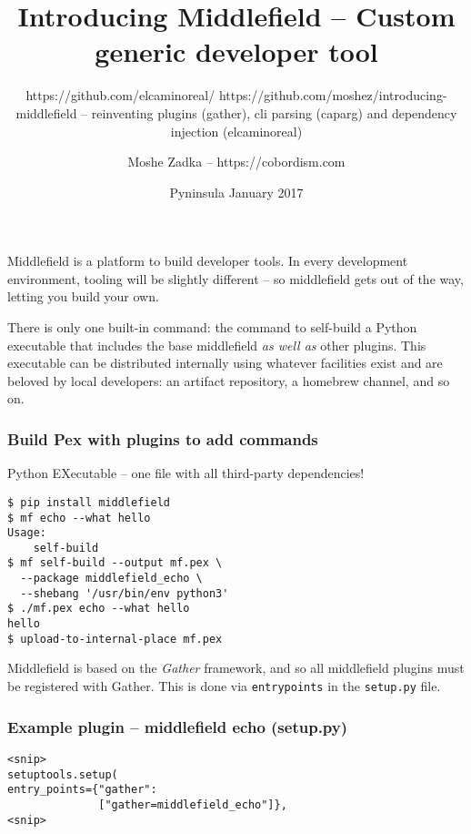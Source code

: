 \usepackage[utf8]{inputenc}
\usepackage{listings}
\usepackage{textcomp}

\title{Introducing Middlefield -- Custom generic developer tool}
\subtitle{https://github.com/elcaminoreal/ https://github.com/moshez/introducing-middlefield -- reinventing plugins (gather), cli parsing (caparg) and dependency injection (elcaminoreal)}
\author{Moshe Zadka -- https://cobordism.com}
\date{Pyninsula January 2017}
 

 
\begin{titlepage}
\maketitle
\end{titlepage}

\frame{\titlepage}

Middlefield is a platform to build developer tools.
In every development environment,
tooling will be slightly different --
so middlefield gets out of the way,
letting you build your own.

There is only one built-in command:
the command to self-build a Python executable that includes
the base middlefield
{\em as well as} 
other plugins.
This executable can be distributed internally using whatever facilities
exist and are beloved by local developers:
an artifact repository,
a homebrew channel,
and so on.

\begin{frame}[fragile]
\frametitle{Build Pex with plugins to add commands}
Python EXecutable -- one file with all third-party dependencies!
\begin{lstlisting}
$ pip install middlefield
$ mf echo --what hello
Usage:
    self-build
$ mf self-build --output mf.pex \
  --package middlefield_echo \
  --shebang '/usr/bin/env python3'
$ ./mf.pex echo --what hello 
hello
$ upload-to-internal-place mf.pex
\end{lstlisting}
\end{frame}

Middlefield is based on the {\em Gather} framework,
and so all middlefield plugins must be registered
with Gather.
This is done via \texttt{entry{\textunderscore}points} in the
\texttt{setup.py}
file.

\begin{frame}[fragile]
\frametitle{Example plugin -- middlefield echo (setup.py)}
\begin{lstlisting}
<snip>
setuptools.setup(
entry_points={"gather":
              ["gather=middlefield_echo"]},
<snip>
\end{lstlisting}
\end{frame}

